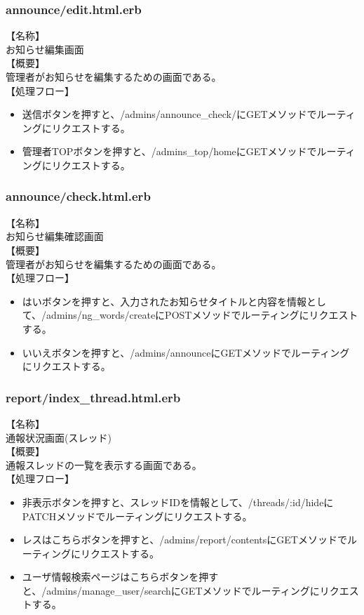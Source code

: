 \documentclass[a4j]{jarticle}
\begin{document}
\subsubsection{announce/edit.html.erb}
\noindent
【名称】\\
お知らせ編集画面\\
【概要】\\
管理者がお知らせを編集するための画面である。\\
【処理フロー】
\begin{itemize}
  \item 送信ボタンを押すと、/admins/announce\_check/にGETメソッドでルーティングにリクエストする。
  \item 管理者TOPボタンを押すと、/admins\_top/homeにGETメソッドでルーティングにリクエストする。
\end{itemize}

\subsubsection{announce/check.html.erb}
\noindent
【名称】\\
お知らせ編集確認画面\\
【概要】\\
管理者がお知らせを編集するための画面である。\\
【処理フロー】
\begin{itemize}
  \item はいボタンを押すと、入力されたお知らせタイトルと内容を情報として、/admins/ng\_words/createにPOSTメソッドでルーティングにリクエストする。
  \item いいえボタンを押すと、/admins/announceにGETメソッドでルーティングにリクエストする。
\end{itemize}


\subsubsection{report/index\_thread.html.erb}
\noindent
【名称】\\
通報状況画面(スレッド)\\
【概要】\\
通報スレッドの一覧を表示する画面である。\\
【処理フロー】
\begin{itemize}
  \item 非表示ボタンを押すと、スレッドIDを情報として、/threads/:id/hideにPATCHメソッドでルーティングにリクエストする。
  \item レスはこちらボタンを押すと、/admins/report/contentsにGETメソッドでルーティングにリクエストする。
  \item ユーザ情報検索ページはこちらボタンを押すと、/admins/manage\_user/searchにGETメソッドでルーティングにリクエストする。
\end{itemize}
\end{document}
